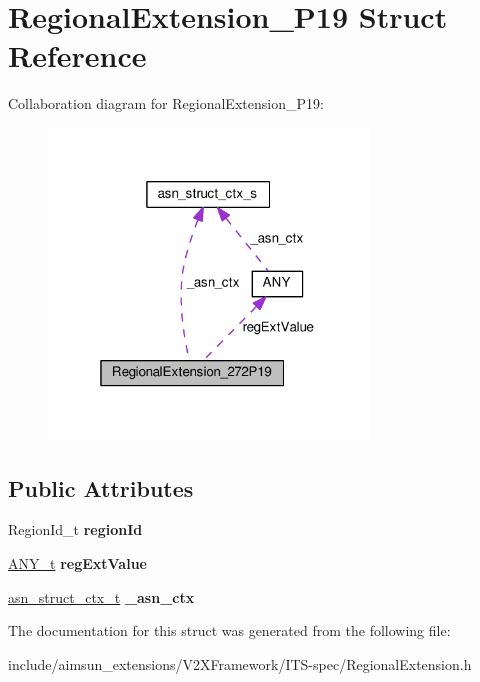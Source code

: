 \hypertarget{structRegionalExtension__272P19}{}\section{Regional\+Extension\+\_\+P19 Struct Reference}
\label{structRegionalExtension__272P19}


Collaboration diagram for Regional\+Extension\+\_\+P19\+:\nopagebreak
\begin{figure}[H]
\begin{center}
\leavevmode
\includegraphics[width=241pt]{structRegionalExtension__272P19__coll__graph}
\end{center}
\end{figure}
\subsection*{Public Attributes}
\begin{DoxyCompactItemize}
\item 
Region\+Id\+\_\+t {\bfseries region\+Id}\hypertarget{structRegionalExtension__272P19_a26001588315f7032b7556c70e1db7050}{}\label{structRegionalExtension__272P19_a26001588315f7032b7556c70e1db7050}

\item 
\hyperlink{structANY}{A\+N\+Y\+\_\+t} {\bfseries reg\+Ext\+Value}\hypertarget{structRegionalExtension__272P19_a977ca1807ad70344167f59bb32d94f87}{}\label{structRegionalExtension__272P19_a977ca1807ad70344167f59bb32d94f87}

\item 
\hyperlink{structasn__struct__ctx__s}{asn\+\_\+struct\+\_\+ctx\+\_\+t} {\bfseries \+\_\+asn\+\_\+ctx}\hypertarget{structRegionalExtension__272P19_a4d988078e073acf78f2f9d0967f11a1f}{}\label{structRegionalExtension__272P19_a4d988078e073acf78f2f9d0967f11a1f}

\end{DoxyCompactItemize}


The documentation for this struct was generated from the following file\+:\begin{DoxyCompactItemize}
\item 
include/aimsun\+\_\+extensions/\+V2\+X\+Framework/\+I\+T\+S-\/spec/Regional\+Extension.\+h\end{DoxyCompactItemize}
